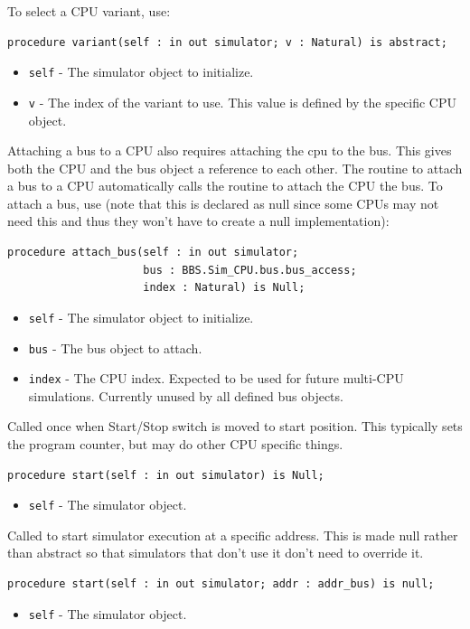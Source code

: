 \documentclass[10pt, openany]{book}
\newcommand{\keyword}[1]{\texttt{#1}}
\begin{document}
To select a CPU variant, use:
\begin{lstlisting}
procedure variant(self : in out simulator; v : Natural) is abstract;
\end{lstlisting}
\begin{itemize}
  \item \keyword{self} - The simulator object to initialize.
  \item \keyword{v} - The index of the variant to use.  This value is defined by the specific CPU object.
\end{itemize}

Attaching a bus to a CPU also requires attaching the cpu to the bus.
This gives both the CPU and the bus object a reference to each other.
The routine to attach a bus to a CPU automatically calls the routine to attach the CPU the bus.
To attach a bus, use (note that this is declared as null since some CPUs may not need this and thus they won't have to create a null implementation):
\begin{lstlisting}
procedure attach_bus(self : in out simulator;
                     bus : BBS.Sim_CPU.bus.bus_access;
                     index : Natural) is Null;
\end{lstlisting}
\begin{itemize}
  \item \keyword{self} - The simulator object to initialize.
  \item \keyword{bus} - The bus object to attach.
  \item \keyword{index} - The CPU index.  Expected to be used for future multi-CPU simulations.  Currently unused by all defined bus objects.
\end{itemize}

Called once when Start/Stop switch is moved to start position.
This typically sets the program counter, but may do other CPU specific things.
\begin{lstlisting}
procedure start(self : in out simulator) is Null;
\end{lstlisting}
\begin{itemize}
  \item \keyword{self} - The simulator object.
\end{itemize}

Called to start simulator execution at a specific address.
This is made null rather than abstract so that simulators that don't use it don't need to override it.
\begin{lstlisting}
procedure start(self : in out simulator; addr : addr_bus) is null;
\end{lstlisting}
\begin{itemize}
  \item \keyword{self} - The simulator object.
\end{itemize}
\end{document}
